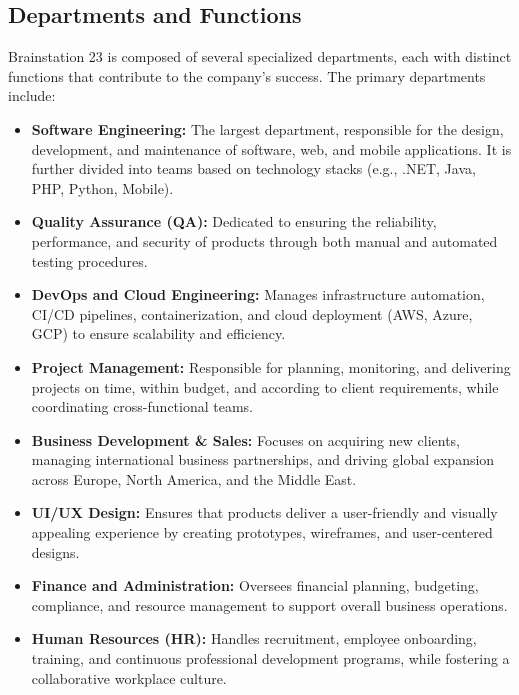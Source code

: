 \documentclass[12pt,a4paper]{article}
\begin{document}
\subsection{Departments and Functions}
Brainstation 23 is composed of several specialized departments, each with distinct functions that contribute to the company's success. The primary departments include:
\begin{itemize}
    \item \textbf{Software Engineering:} The largest department, responsible for the design, development, and maintenance of software, web, and mobile applications. It is further divided into teams based on technology stacks (e.g., .NET, Java, PHP, Python, Mobile).
    
    \item \textbf{Quality Assurance (QA):} Dedicated to ensuring the reliability, performance, and security of products through both manual and automated testing procedures.
    
    \item \textbf{DevOps and Cloud Engineering:} Manages infrastructure automation, CI/CD pipelines, containerization, and cloud deployment (AWS, Azure, GCP) to ensure scalability and efficiency.
    
    \item \textbf{Project Management:} Responsible for planning, monitoring, and delivering projects on time, within budget, and according to client requirements, while coordinating cross-functional teams.
    
    \item \textbf{Business Development \& Sales:} Focuses on acquiring new clients, managing international business partnerships, and driving global expansion across Europe, North America, and the Middle East.
    
    \item \textbf{UI/UX Design:} Ensures that products deliver a user-friendly and visually appealing experience by creating prototypes, wireframes, and user-centered designs.
    
    \item \textbf{Finance and Administration:} Oversees financial planning, budgeting, compliance, and resource management to support overall business operations.
    
    \item \textbf{Human Resources (HR):} Handles recruitment, employee onboarding, training, and continuous professional development programs, while fostering a collaborative workplace culture.
    

\end{itemize}
\end{document}

